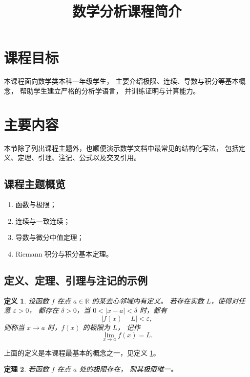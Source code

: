 \documentclass[UTF8]{ctexart}
\title{数学分析课程简介}
\date{}
\newtheorem{theorem}{定理}[section]
\newtheorem{definition}[theorem]{定义}
\numberwithin{equation}{section}
\newcommand{\RR}{\mathbb{R}}
\begin{document}
\maketitle

\section{课程目标}

本课程面向数学类本科一年级学生，
主要介绍极限、连续、导数与积分等基本概念，
帮助学生建立严格的分析学语言，
并训练证明与计算能力。

\section{主要内容}

本节除了列出课程主题外，也顺便演示数学文档中最常见的结构化写法，
包括定义、定理、引理、注记、公式以及交叉引用。

\subsection{课程主题概览}

\begin{enumerate}
  \item 函数与极限；
  \item 连续与一致连续；
  \item 导数与微分中值定理；
  \item Riemann 积分与积分基本定理。
\end{enumerate}

\subsection{定义、定理、引理与注记的示例}

\begin{definition}\label{def:limit}
设函数 $f$ 在点 $a \in \RR$ 的某去心邻域内有定义。
若存在实数 $L$，使得对任意 $\varepsilon>0$，
都存在 $\delta>0$，当 $0<|x-a|<\delta$ 时，都有
\[
|f(x)-L|<\varepsilon,
\]
则称当 $x\to a$ 时，$f(x)$ 的极限为 $L$，
记作
\[
\lim_{x\to a} f(x)=L.
\]
\end{definition}

上面的定义是本课程最基本的概念之一，见定义 \ref{def:limit}。

\begin{theorem}\label{thm:unique-limit}
若函数 $f$ 在点 $a$ 处的极限存在，
则其极限唯一。
\end{theorem}
\end{document}
